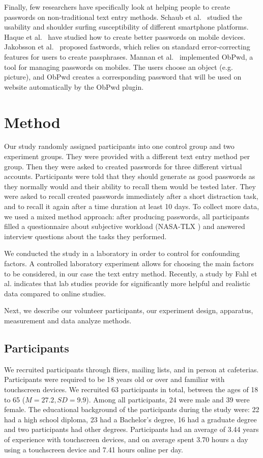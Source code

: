 \documentclass[conference]{IEEEtran}
\begin{document}
Finally, few researchers have specifically look at helping people to create passwords on non-traditional text entry methods. Schaub et al.~\cite{Schaub:2012:PEU:2406367.2406384} studied the usability and shoulder surfing susceptibility of different smartphone platforms. Haque et al.~\cite{Haque:2013:PIT:2516760.2516767} have studied how to create better passwords on mobile devices. Jakobsson et al.~\cite{rethinkingpasswords} proposed fastwords, which relies on standard error-correcting features for users to create passphrases. Mannan et al.~\cite{mohammadboth} implemented ObPwd, a tool for managing passwords on mobiles. The users choose an object (e.g. picture), and ObPwd creates a corresponding password that will be used on website automatically by the ObPwd plugin. 


\section{Method}

Our study randomly assigned participants into one control group and two experiment groups. They were provided with a different text entry method per group. Then they were asked to created passwords for three different virtual accounts. Participants were told that they should generate as good passwords as they normally would and their ability to recall them would be tested later. They were asked to recall created passwords immediately after a short distraction task, and to recall it again after a time duration at least 10 days. To collect more data, we used a mixed method approach: after producing passwords, all participants filled a questionnaire about subjective workload (NASA-TLX \cite{hart:tlx}) and answered interview questions about the tasks they performed.


We conducted the study in a laboratory in order to control for confounding factors. A controlled laboratory experiment allows for choosing the main factors to be considered, in our case the
text entry method. Recently, a study by Fahl et al.\cite{Fahl:2013:EVP:2501604.2501617} indicates that lab studies provide for significantly more helpful and realistic data compared to online studies.

Next, we describe our volunteer participants, our experiment design, apparatus, measurement and data analyze methods.

\subsection{Participants}
We recruited participants through fliers, mailing lists, and in person at cafeterias. Participants were required to be 18 years old or over and familiar with touchscreen devices. 
We recruited 63 participants in total, between the ages of 18 to 65 ($M = 27.2, SD = 9.9$). Among all participants, 24 were male and 39 were female. The educational background of the participants during the study were: 22 had a high school diploma, 23 had a Bachelor's degree, 16 had a graduate degree and two participants had other degrees. Participants had an average of 3.44 years of experience with touchscreen devices, and on average spent 3.70 hours a day using a touchscreen device and 7.41 hours online per day. 
\end{document}
